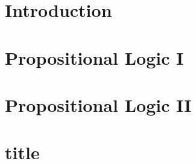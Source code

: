 \documentclass[12pt,openany]{book}
\begin{document}
	
	
	\tableofcontents
	\newpage
	
	\newpage
	\chapter{Introduction}
	
	
	\newpage
%	
	
	\newpage
	\chapter{Propositional Logic I}
	
	
	\newpage
	\chapter{Propositional Logic II}
	
	
	\newpage
	\chapter{title}
	
	
%	
	
%	
	
	
\end{document}
